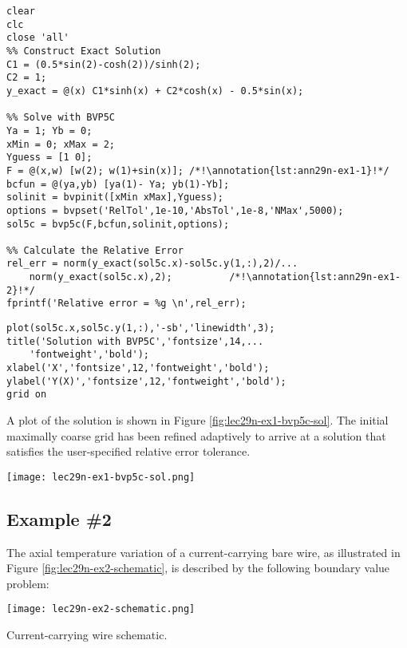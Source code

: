 \begin{lstlisting}[style=myMatlab,name=lec29n-ex1]
clear
clc
close 'all'
%% Construct Exact Solution
C1 = (0.5*sin(2)-cosh(2))/sinh(2);
C2 = 1;
y_exact = @(x) C1*sinh(x) + C2*cosh(x) - 0.5*sin(x);

%% Solve with BVP5C
Ya = 1; Yb = 0;
xMin = 0; xMax = 2;
Yguess = [1 0];
F = @(x,w) [w(2); w(1)+sin(x)]; /*!\annotation{lst:ann29n-ex1-1}!*/
bcfun = @(ya,yb) [ya(1)- Ya; yb(1)-Yb];
solinit = bvpinit([xMin xMax],Yguess);
options = bvpset('RelTol',1e-10,'AbsTol',1e-8,'NMax',5000);
sol5c = bvp5c(F,bcfun,solinit,options);

%% Calculate the Relative Error
rel_err = norm(y_exact(sol5c.x)-sol5c.y(1,:),2)/...
    norm(y_exact(sol5c.x),2);          /*!\annotation{lst:ann29n-ex1-2}!*/
fprintf('Relative error = %g \n',rel_err);
\end{lstlisting}
\begin{lstlisting}[style=myMatlab,name=lec29n-ex1]
%% Plot the solution
plot(sol5c.x,sol5c.y(1,:),'-sb','linewidth',3);
title('Solution with BVP5C','fontsize',14,...
    'fontweight','bold');
xlabel('X','fontsize',12,'fontweight','bold');
ylabel('Y(X)','fontsize',12,'fontweight','bold');
grid on
\end{lstlisting}


\noindent A plot of the solution is shown in Figure \ref{fig:lec29n-ex1-bvp5c-sol}. The initial maximally coarse grid has been refined adaptively to arrive at a solution that satisfies the user-specified relative error tolerance.  

\begin{marginfigure}[-3.5cm]
\texttt{[image: lec29n-ex1-bvp5c-sol.png]}
\caption{Solution of example problem with \lstinline[style=myMatlab]{bvp5c}.}
\label{fig:lec29n-ex1-bvp5c-sol}
\end{marginfigure}

\subsection{Example \#2}

\noindent The axial temperature variation of a current-carrying bare wire, as illustrated in Figure \ref{fig:lec29n-ex2-schematic}, is described by the following boundary value problem:

\begin{marginfigure}
\texttt{[image: lec29n-ex2-schematic.png]}
\caption{Current-carrying wire schematic.}
\label{fig:lec29n-ex2-schematic}
\end{marginfigure}

